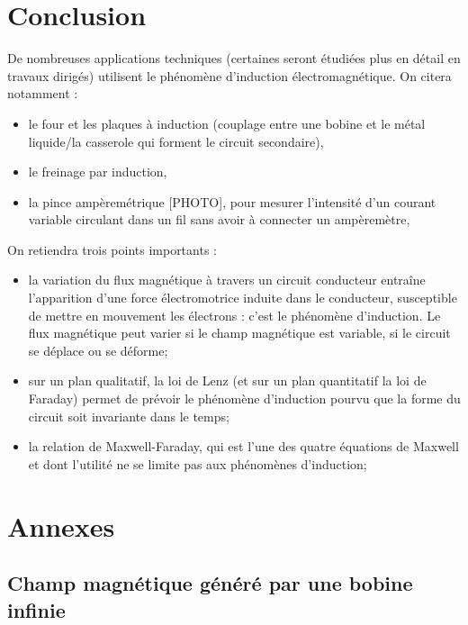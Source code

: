 \documentclass[11pt,a4paper]{report}
\begin{document}
\section{Conclusion}

De nombreuses applications techniques (certaines seront étudiées plus en détail en travaux dirigés) utilisent le phénomène d'induction électromagnétique. On citera notamment :
\begin{itemize}
	\item le four et les plaques à induction (couplage entre une bobine et le métal liquide/la casserole qui forment le circuit secondaire),
	\item le freinage par induction,
	\item la pince ampèremétrique [PHOTO], pour mesurer l'intensité d'un courant variable circulant dans un fil sans avoir à connecter un ampèremètre,
\end{itemize}

On retiendra trois points importants :
\begin{itemize}
	\item la variation du flux magnétique à travers un circuit conducteur entraîne l'apparition d'une force électromotrice induite dans le conducteur, susceptible de mettre en mouvement 
	les électrons : c'est le phénomène d'induction. Le flux magnétique peut varier si le champ magnétique est variable, si le circuit se déplace ou se déforme;
	\item sur un plan qualitatif, la loi de Lenz (et sur un plan quantitatif la loi de Faraday) permet de prévoir le phénomène d'induction pourvu que la forme du circuit soit invariante 
	dans le temps; 
	\item la relation de Maxwell-Faraday, qui est l'une des quatre équations de Maxwell et dont l'utilité ne se limite pas aux phénomènes d'induction;
\end{itemize}

\newpage
\section{Annexes}
\subsection{Champ magnétique généré par une bobine infinie}
\end{document}
